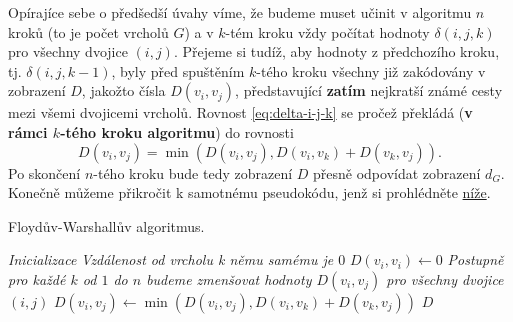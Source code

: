 Opírajíce sebe o předšedší úvahy víme, že budeme muset učinit v algoritmu $n$
kroků (to je počet vrcholů $G$) a v $k$-tém kroku vždy počítat hodnoty
$\delta(i,j,k)$ pro všechny dvojice $(i,j)$. Přejeme si tudíž, aby hodnoty z
předchozího kroku, tj. $\delta(i,j,k-1)$, byly před spuštěním $k$-tého kroku
všechny již zakódovány v zobrazení $D$, jakožto čísla $D(v_i,v_j)$,
představující \textbf{zatím} nejkratší známé cesty mezi všemi dvojicemi vrcholů.
Rovnost \eqref{eq:delta-i-j-k} se pročež překládá (\textbf{v rámci $k$-tého
kroku algoritmu}) do rovnosti
\[
 D(v_i,v_j) = \min(D(v_i,v_j), D(v_i,v_k) + D(v_k, v_j)).
\]
Po skončení $n$-tého kroku bude tedy zobrazení $D$ přesně odpovídat zobrazení
$d_G$. Konečně můžeme přikročit k samotnému pseudokódu, jenž si prohlédněte
\hyperref[alg:floyd-warshall]{níže}.

\begin{algorithm}
 \caption{Floydův-Warshallův algoritmus.}
 \label{alg:floyd-warshall}


 \Output{zobrazení $D:V^2 \to (0,\infty]$ takové, že $D \equiv d_G$}
 \BlankLine
 \emph{Inicializace}\;
  {
   {
    {
    \emph{Vzdálenost od vrcholu k němu samému je $0$}\;
    $D(v_i,v_i) \leftarrow 0$\;
   }
  }
 }
 \BlankLine
 \emph{Postupně pro každé $k$ od $1$ do $n$ budeme zmenšovat hodnoty
 $D(v_i,v_j)$ pro všechny dvojice $(i,j)$}\;
  {
   {
    {
    $D(v_i,v_j) \leftarrow \min(D(v_i,v_j), D(v_i,v_k) + D(v_k,v_j))$\;
   }
  }
 }
 \KwReturn $D$\;
\end{algorithm}

